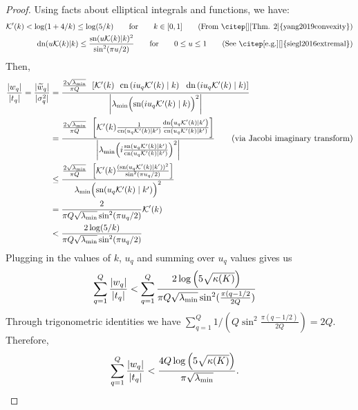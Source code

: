 \begin{proof}
  Using facts about elliptical integrals and functions, we have:
  \begin{align}
    \mathcal{K}'(k) < \log(1 + 4 / k) \leq \log( 5 / k) \qquad {\rm for} \qquad k \in [0, 1]
    \tag{From \citep[][Thm. 2]{yang2019convexity}}
    \\
    \text{dn}(u \mathcal{K}(k) | k ) \le \frac{\text{sn}(u \mathcal{K}(k) | k )^2}{\sin^2(\pi u/2)} \qquad {\rm for} \qquad 0 \le u \le 1
    \tag{See \citep[e.g.][]{siegl2016extremal}}
  \end{align}
  Then,
  \begin{align*}
    \frac{|w_q|}{|t_q|}
    =
    \frac{|\widetilde w_q|}{|\sigma^2_q|}
    &= \frac{
      \frac{ 2 \sqrt{\lambda_\text{min}} }{ \pi Q }
      \:\: \left[
      \mathcal{K}'( k )
      \:\:\: \text{cn} \left( i u_q \mathcal{K}'(k) \mid k \right)
      \:\:\: \text{dn} \left( i u_q \mathcal{K}'(k) \mid k \right)
      \right]
    }{
      \left| \lambda_\text{min} \Bigl( \text{sn}(i u_q \mathcal{K}'(k) \mid k) \Bigr)^2 \right|
    }
    \\
    &= \frac{
      \frac{ 2 \sqrt{\lambda_\text{min}} }{ \pi Q }
      \:\: \left[
      \mathcal{K}'( k )
      \frac{
        1
      }{
        \text{cn} \left( u_q \mathcal{K}'(k) \mid k' \right)
      }
      \frac{
        \text{dn} \left( u_q \mathcal{K}'(k) \mid k' \right)
      }{
        \text{cn} \left( u_q \mathcal{K}'(k) \mid k' \right)
      }
      \right]
    }{
      \left| \lambda_\text{min} \Bigl( i \frac{
        \text{sn}(u_q \mathcal{K}'(k) \mid k')
      }{
        \text{cn}(u_q \mathcal{K}'(k) \mid k')
      }\Bigr)^2 \right|
    }
    \tag{via Jacobi imaginary transform}
    \\
    &\leq \frac{
      \frac{ 2 \sqrt{\lambda_\text{min}} }{ \pi Q }
      \:\: \left[
        \mathcal{K}'( k ) \frac{
          ({
            \text{sn}(u_q \mathcal{K}'(k) \mid k')
          })^2
        }{
          \sin^2 ( \pi u_q / 2)
        }
      \right]
    }{
      \lambda_\text{min} \Bigl({
        \text{sn}(u_q \mathcal{K}'(k) \mid k')
      }\Bigr)^2
    }
    \\
    &= \frac{ 2  }{ \pi Q \sqrt{\lambda_\text{min}} \sin^2 ( \pi u_q / 2) } \mathcal{K}'(k)
    \\
    &< \frac{ 2 \log(5 / k) }{ \pi Q  \sqrt{\lambda_\text{min}} \sin^2 ( \pi u_q / 2) }
  \end{align*}
  Plugging in the values of $k$, $u_q$ and summing over $u_q$ values gives us
  \begin{align}
    \sum_{q=1}^Q \frac{|w_q|}{|t_q|}
    &<
    \sum_{q=1}^Q \frac{ 2 \log \left( 5 \sqrt{\kappa(K)} \right)}
    { \pi Q \sqrt{\lambda_\text{min}} \sin^2 ( \frac{\pi (q - 1/2}{2Q}) }
  \end{align}
  Through trigonometric identities we have
  $\sum_{q=1}^Q 1 / ( Q \sin^2 \frac{\pi(q- 1/2 )}{2Q} )  = 2 Q$.
  Therefore,
  \begin{align*}
    \sum_{q=1}^Q \frac{|w_q|}{|t_q|}
    &< \frac{4 Q \log \left( 5 \sqrt{\kappa(K)} \right)}{\pi \sqrt{\lambda_\text{min}}}.
  \end{align*}
\end{proof}
